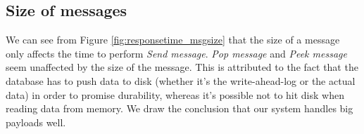 \documentclass{article}
\begin{document}


        \subsection{Size of messages}
            We can see from Figure \ref{fig:responsetime_msgsize} that the size of a message only affects the time to perform \textit{Send message}. \textit{Pop message} and \textit{Peek message} seem unaffected by the size of the message. This is attributed to the fact that the database has to push data to disk (whether it's the write-ahead-log or the actual data) in order to promise durability, whereas it's possible not to hit disk when reading data from memory. We draw the conclusion that our system handles big payloads well.


\end{document}
